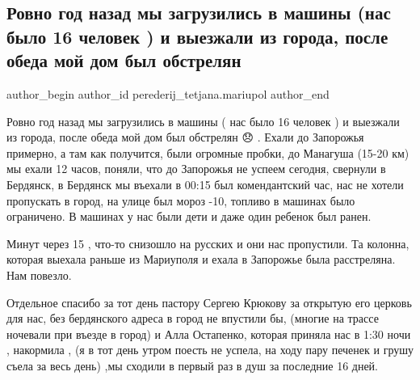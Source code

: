  
 
 
 
 

\subsection{Ровно год назад мы загрузились в машины (нас было 16 человек ) и выезжали из города, после обеда мой дом был обстрелян }
\label{sec:16_03_2023.fb.perederij_tetjana.mariupol.1.mashyny_gorod_16_chelovek}

\ifcmt
 author_begin
   author_id perederij_tetjana.mariupol
 author_end
\fi

Ровно год назад мы загрузились в машины ( нас было 16 человек ) и выезжали из
города, после обеда мой дом был обстрелян 😞 . Ехали до Запорожья примерно, а
там как получится, были огромные пробки, до Манагуша (15-20 км) мы ехали 12
часов, поняли, что до Запорожья не успеем сегодня, свернули в Бердянск, в
Бердянск мы въехали в 00:15 был комендантский час, нас не хотели пропускать в
город, на улице был мороз -10, топливо в машинах было ограничено.  В машинах у
нас были дети и даже один ребенок был ранен. 

Минут через 15 , что-то снизошло на русских и они нас пропустили. Та колонна,
которая выехала раньше из Мариуполя и ехала в Запорожье была расстреляна. Нам
повезло. 

Отдельное спасибо за тот день пастору Сергею Крюкову за открытую его церковь
для нас, без бердянского адреса в город не впустили бы, (многие на трассе
ночевали при въезде в город) и Алла Остапенко, которая приняла нас в 1:30 ночи
, накормила , (я в тот день утром поесть не успела, на ходу пару печенек и
грушу съела за весь день)  ,мы сходили в первый раз в душ за последние 16 дней.

